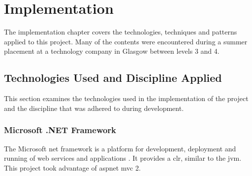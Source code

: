 \chapter{Implementation}
\label{impl}
The implementation chapter covers the technologies, techniques and patterns applied to this project.  Many of the contents were encountered during a summer placement at a technology company in Glasgow between levels 3 and 4.  

\section{Technologies Used and Discipline Applied}
This section examines the technologies used in the implementation of the project and the discipline that was adhered to during development.

\subsection{Microsoft .NET Framework}
The Microsoft \gls{net} framework is a platform for development, deployment and running of web services and applications \cite{whatIsDotNet}.  It provides a \gls{clr}, similar to the \gls{jvm}.  This project took advantage of \gls{asp}\gls{net} \gls{mvc} 2.  

